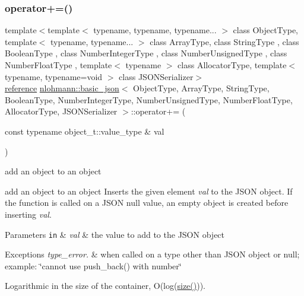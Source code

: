 \subsubsection{\texorpdfstring{operator+=()}{operator+=()}\hspace{0.1cm}{\footnotesize\ttfamily [3/4]}}
{\footnotesize\ttfamily template$<$template$<$ typename, typename, typename... $>$ class Object\+Type, template$<$ typename, typename... $>$ class Array\+Type, class String\+Type , class Boolean\+Type , class Number\+Integer\+Type , class Number\+Unsigned\+Type , class Number\+Float\+Type , template$<$ typename $>$ class Allocator\+Type, template$<$ typename, typename=void $>$ class J\+S\+O\+N\+Serializer$>$ \\
\hyperlink{classnlohmann_1_1basic__json_ac6a5eddd156c776ac75ff54cfe54a5bc}{reference} \hyperlink{classnlohmann_1_1basic__json}{nlohmann\+::basic\+\_\+json}$<$ Object\+Type, Array\+Type, String\+Type, Boolean\+Type, Number\+Integer\+Type, Number\+Unsigned\+Type, Number\+Float\+Type, Allocator\+Type, J\+S\+O\+N\+Serializer $>$\+::operator+= (\begin{DoxyParamCaption}\item[{const typename object\+\_\+t\+::value\+\_\+type \&}]{val }\end{DoxyParamCaption})\hspace{0.3cm}{\ttfamily [inline]}}



add an object to an object 

add an object to an object Inserts the given element {\itshape val} to the J\+S\+ON object. If the function is called on a J\+S\+ON null value, an empty object is created before inserting {\itshape val}.


\begin{DoxyParams}[1]{Parameters}
\mbox{\tt in}  & {\em val} & the value to add to the J\+S\+ON object\\
\hline
\end{DoxyParams}

\begin{DoxyExceptions}{Exceptions}
{\em type\+\_\+error.} & when called on a type other than J\+S\+ON object or null; example\+: {\ttfamily \char`\"{}cannot use push\+\_\+back() with number\char`\"{}}\\
\hline
\end{DoxyExceptions}
Logarithmic in the size of the container, O(log({\ttfamily \hyperlink{classnlohmann_1_1basic__json_a25e27ad0c6d53c01871c5485e1f75b96}{size()}})).

